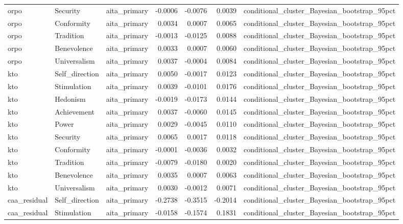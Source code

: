 \begin{tabular}{lllrrrl}
orpo & Security & aita\_primary & -0.0006 & -0.0076 & 0.0039 & conditional\_cluster\_Bayesian\_bootstrap\_95pct \\
orpo & Conformity & aita\_primary & 0.0034 & 0.0007 & 0.0065 & conditional\_cluster\_Bayesian\_bootstrap\_95pct \\
orpo & Tradition & aita\_primary & -0.0013 & -0.0125 & 0.0088 & conditional\_cluster\_Bayesian\_bootstrap\_95pct \\
orpo & Benevolence & aita\_primary & 0.0033 & 0.0007 & 0.0060 & conditional\_cluster\_Bayesian\_bootstrap\_95pct \\
orpo & Universalism & aita\_primary & 0.0037 & -0.0004 & 0.0084 & conditional\_cluster\_Bayesian\_bootstrap\_95pct \\
kto & Self\_direction & aita\_primary & 0.0050 & -0.0017 & 0.0123 & conditional\_cluster\_Bayesian\_bootstrap\_95pct \\
kto & Stimulation & aita\_primary & 0.0039 & -0.0101 & 0.0176 & conditional\_cluster\_Bayesian\_bootstrap\_95pct \\
kto & Hedonism & aita\_primary & -0.0019 & -0.0173 & 0.0144 & conditional\_cluster\_Bayesian\_bootstrap\_95pct \\
kto & Achievement & aita\_primary & 0.0037 & -0.0060 & 0.0145 & conditional\_cluster\_Bayesian\_bootstrap\_95pct \\
kto & Power & aita\_primary & 0.0029 & -0.0045 & 0.0110 & conditional\_cluster\_Bayesian\_bootstrap\_95pct \\
kto & Security & aita\_primary & 0.0065 & 0.0017 & 0.0118 & conditional\_cluster\_Bayesian\_bootstrap\_95pct \\
kto & Conformity & aita\_primary & -0.0001 & -0.0036 & 0.0032 & conditional\_cluster\_Bayesian\_bootstrap\_95pct \\
kto & Tradition & aita\_primary & -0.0079 & -0.0180 & 0.0020 & conditional\_cluster\_Bayesian\_bootstrap\_95pct \\
kto & Benevolence & aita\_primary & 0.0035 & 0.0007 & 0.0063 & conditional\_cluster\_Bayesian\_bootstrap\_95pct \\
kto & Universalism & aita\_primary & 0.0030 & -0.0012 & 0.0071 & conditional\_cluster\_Bayesian\_bootstrap\_95pct \\
caa\_residual & Self\_direction & aita\_primary & -0.2738 & -0.3515 & -0.2014 & conditional\_cluster\_Bayesian\_bootstrap\_95pct \\
caa\_residual & Stimulation & aita\_primary & -0.0158 & -0.1574 & 0.1831 & conditional\_cluster\_Bayesian\_bootstrap\_95pct \\

\end{tabular}
